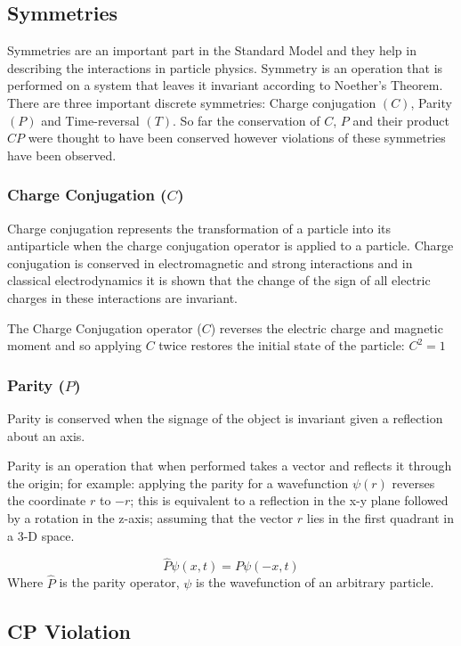 \documentclass[12pt,a4paper]{article}
\begin{document}
\subsection{Symmetries}
Symmetries are an important part in the Standard Model and they help in describing the interactions in particle physics. Symmetry is an operation that is performed on a system that leaves it invariant according to Noether's Theorem. 
There are three important discrete symmetries: Charge conjugation $(C)$, Parity $(P)$ and Time-reversal $(T)$. So far the conservation of $C$, $P$ and their product $CP$ were thought to have been conserved however violations of these symmetries have been observed.   \par


\subsubsection{Charge Conjugation ($C$)}
Charge conjugation represents the transformation of a particle into its antiparticle when the charge conjugation operator is applied to a particle. Charge conjugation is conserved in electromagnetic and strong interactions and in classical electrodynamics it is shown that the change of the sign of all electric charges in these interactions are invariant.

The Charge Conjugation operator ($C$) reverses the electric charge and magnetic moment and so applying $C$ twice restores the initial state of the particle: $C^2 = 1$

\subsubsection{Parity ($P$)}
Parity is conserved when the signage of the object is invariant given a reflection about an axis.

Parity is an operation that when performed takes a vector and reflects it through the origin; for example: applying the parity for a wavefunction $\psi(r)$ reverses the coordinate $r$ to $-r$; this is equivalent to a reflection in the x-y plane followed by a rotation in the z-axis; assuming that the vector $r$ lies in the first quadrant in a 3-D space.

 \[\hat{P}\psi(x,t) = P\psi(-x,t) \]
Where $\hat{P}$ is the parity operator, $\psi$ is the wavefunction of an arbitrary particle.
 
 

\subsection{CP Violation}
\end{document}
